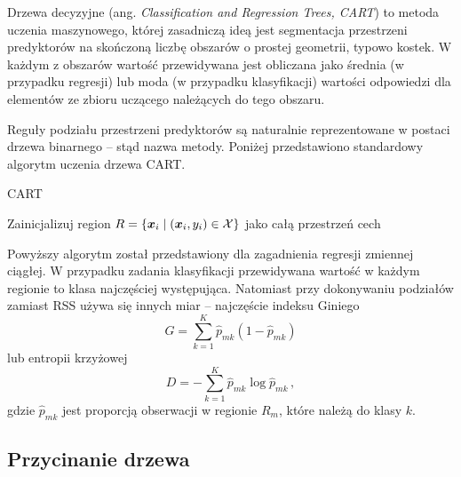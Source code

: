 \documentclass{myclass}
\begin{document}
Drzewa decyzyjne (ang. \emph{Classification and Regression Trees, CART}) to metoda uczenia
maszynowego, której zasadniczą ideą jest segmentacja przestrzeni predyktorów na skończoną liczbę
obszarów o prostej geometrii, typowo kostek. W każdym z obszarów wartość przewidywana jest obliczana
jako średnia (w przypadku regresji) lub moda (w przypadku klasyfikacji) wartości odpowiedzi dla
elementów ze zbioru uczącego należących do tego obszaru.

Reguły podziału przestrzeni predyktorów są naturalnie reprezentowane w postaci drzewa binarnego --
stąd nazwa metody. Poniżej przedstawiono standardowy algorytm uczenia drzewa CART.


\begin{algorithm}[ht]
\caption{CART}

Zainicjalizuj region $R = \{\bm{x}_i \mid (\bm{x}_i, y_i) \in \mathcal{X}\}$ jako całą przestrzeń cech\;

\end{algorithm}

Powyższy algorytm został przedstawiony dla zagadnienia regresji zmiennej ciągłej. W przypadku
zadania klasyfikacji przewidywana wartość w każdym regionie to klasa najczęściej występująca.
Natomiast przy dokonywaniu podziałów zamiast RSS używa się innych miar -- najczęście indeksu Giniego
\[
    G = \sum_{k=1}^K \hat{p}_{mk} ( 1 - \hat{p}_{mk})
\]
lub entropii krzyżowej 
\[
    D = -\sum_{k=1}^K \hat{p}_{mk} \log \hat{p}_{mk}\,,
\]
gdzie $\hat{p}_{mk}$ jest proporcją obserwacji w regionie $R_m$, które należą do klasy $k$.

\subsection{Przycinanie drzewa}
\end{document}
